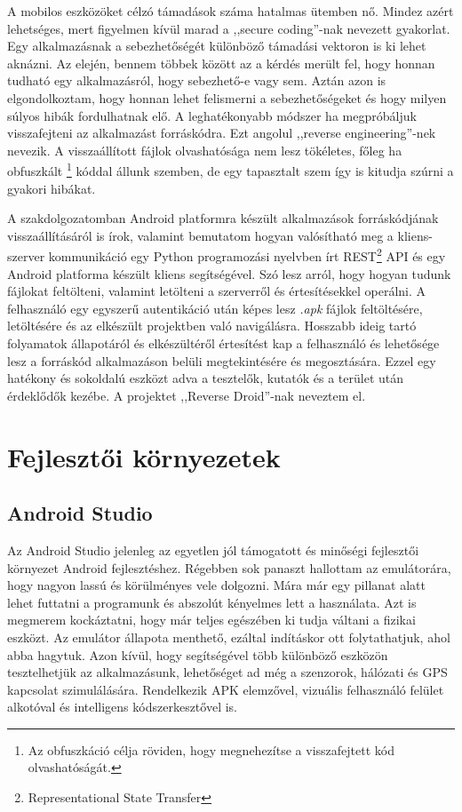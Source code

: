 \documentclass{thesis-ekf}
\theoremstyle{definition}
\theoremstyle{remark}
\begin{document}
A mobilos eszközöket célzó támadások száma hatalmas ütemben nő. Mindez azért lehetséges, mert figyelmen kívül marad a ,,secure coding''-nak nevezett gyakorlat.
Egy alkalmazásnak a sebezhetőségét különböző támadási vektoron is ki lehet aknázni.
Az elején, bennem többek között az a kérdés merült fel, hogy honnan tudható egy alkalmazásról, hogy sebezhető-e vagy sem.
Aztán azon is elgondolkoztam, hogy honnan lehet felismerni a sebezhetőségeket és hogy milyen súlyos hibák fordulhatnak elő.
A leghatékonyabb módszer ha megpróbáljuk visszafejteni az alkalmazást forráskódra.
Ezt angolul ,,reverse engineering''-nek nevezik.
A visszaállított fájlok olvashatósága nem lesz tökéletes, főleg ha obfuszkált \footnote{Az obfuszkáció célja röviden, hogy megnehezítse a visszafejtett kód olvashatóságát.} kóddal állunk szemben, de egy tapasztalt szem így is kitudja szúrni a gyakori hibákat.

A szakdolgozatomban Android platformra készült alkalmazások forráskódjának visszaállításáról is írok, valamint bemutatom hogyan valósítható meg a kliens-szerver kommunikáció egy Python programozási nyelvben írt REST\footnote{Representational State Transfer} API és egy Android platforma készült kliens segítségével.
Szó lesz arról, hogy hogyan tudunk fájlokat feltölteni, valamint letölteni a szerverről és értesítésekkel operálni.
A felhasználó egy egyszerű autentikáció után képes lesz \emph{.apk} fájlok feltöltésére, letöltésére és az elkészült projektben való navigálásra.
Hosszabb ideig tartó folyamatok állapotáról és elkészültéről értesítést kap a felhasználó és lehetősége lesz a forráskód alkalmazáson belüli megtekintésére és megosztására.
Ezzel egy hatékony és sokoldalú eszközt adva a tesztelők, kutatók és a terület után érdeklődők kezébe.
A projektet ,,Reverse Droid''-nak neveztem el.

\chapter{Fejlesztői környezetek}\label{kornyezetek}

\section{Android Studio}\label{androi_studio}

Az Android Studio jelenleg az egyetlen jól támogatott és minőségi fejlesztői környezet Android fejlesztéshez.
Régebben sok panaszt hallottam az emulátorára, hogy nagyon lassú és körülményes vele dolgozni.
Mára már egy pillanat alatt lehet futtatni a programunk és abszolút kényelmes lett a használata.
Azt is megmerem kockáztatni, hogy már teljes egészében ki tudja váltani a fizikai eszközt.
Az emulátor állapota menthető, ezáltal indításkor ott folytathatjuk, ahol abba hagytuk.
Azon kívül, hogy segítségével több különböző eszközön tesztelhetjük az alkalmazásunk, lehetőséget ad még a szenzorok, hálózati és GPS kapcsolat szimulálására. 
Rendelkezik APK elemzővel, vizuális felhasználó felület alkotóval és intelligens kódszerkesztővel is.
\end{document}
